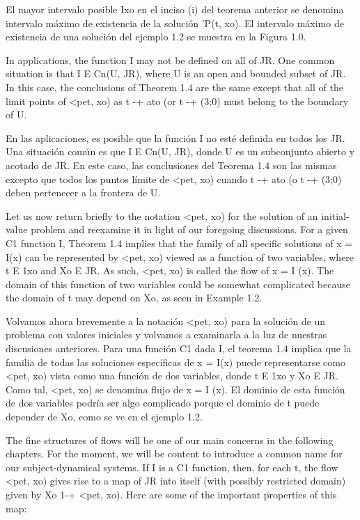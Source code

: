 \documentclass[]{article}
\begin{document}
El mayor intervalo posible Ixo en el inciso (i) del teorema anterior se denomina intervalo máximo de existencia de la solución 'P(t, xo). El intervalo máximo de existencia de una solución del ejemplo 1.2 se muestra en la Figura 1.0.




In applications, the function I may not be defined on all of JR. One common situation is that I E Cn(U, JR), where U is an open and bounded subset of JR. In this case, the conclusions of Theorem 1.4 are the same except that all of the limit points of <pet, xo) as t -+ ato (or t -+ (3;0) must belong to the boundary of U.

En las aplicaciones, es posible que la función I no esté definida en todos los JR. Una situación común es que I E Cn(U, JR), donde U es un subconjunto abierto y acotado de JR. En este caso, las conclusiones del Teorema 1.4 son las mismas excepto que todos los puntos límite de <pet, xo) cuando t -+ ato (o t -+ (3;0) deben pertenecer a la frontera de U.

Let us now return briefly to the notation <pet, xo) for the solution of an initial-value problem and reexamine it in light of our foregoing discussions. For a given C1 function I, Theorem 1.4 implies that the family of all specific solutions of x = I(x) can be represented by <pet, xo) viewed as a function of two variables, where t E 1xo and Xo E JR. As such, <pet, xo) is called the flow of x = I (x). The domain of this function of two variables could be somewhat complicated because the domain of t may depend on Xo, as seen in Example 1.2.

Volvamos ahora brevemente a la notación <pet, xo) para la solución de un problema con valores iniciales y volvamos a examinarla a la luz de nuestras discusiones anteriores. Para una función C1 dada I, el teorema 1.4 implica que la familia de todas las soluciones específicas de x = I(x) puede representarse como <pet, xo) vista como una función de dos variables, donde t E 1xo y Xo E JR. Como tal, <pet, xo) se denomina flujo de x = I (x). El dominio de esta función de dos variables podría ser algo complicado porque el dominio de t puede depender de Xo, como se ve en el ejemplo 1.2.

The fine structures of flows will be one of our main concerns in the following chapters. For the moment, we will be content to introduce a common name for our subject-dynamical systems. If I is a C1 function, then, for each t, the flow <pet, xo) gives rise to a map of JR into itself (with possibly restricted domain) given by Xo 1-+ <pet, xo). Here are some of the important properties of this map:
\end{document}
